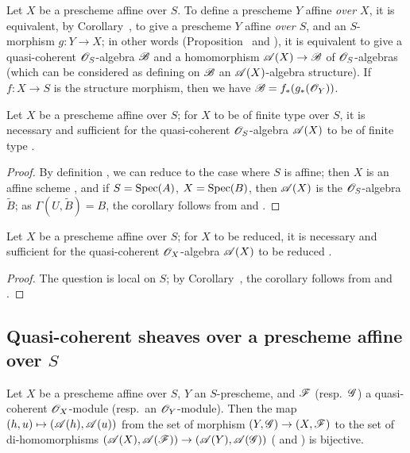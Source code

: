 \begin{env}[1.3.6]
\label{2.1.3.6}
Let $X$ be a prescheme affine over $S$.
To define a prescheme $Y$ affine \emph{over $X$}, it is equivalent, by Corollary~, to give a prescheme $Y$ affine \emph{over $S$}, and an $S$-morphism $g:Y\to X$; in other words (Proposition~ and ), it is equivalent to give a quasi-coherent $\mathscr{O}_S$-algebra $\mathscr{B}$ and a homomorphism $\sh{A}(X)\to\sh{B}$ of $\mathscr{O}_S$-algebras (which can be considered as defining on $\mathscr{B}$ an $\mathscr{A}(X)$-algebra structure).
If $f:X\to S$ is the structure morphism, then we have $\mathscr{B}=f_*(g_*(\mathscr{O}_Y))$.
\end{env}

\begin{corollary}[1.3.7]
\label{2.1.3.7}
Let $X$ be a prescheme affine over $S$; for $X$ to be of finite type over $S$, it is necessary and sufficient for the quasi-coherent $\mathscr{O}_S$-algebra $\mathscr{A}(X)$ to be of finite type .
\end{corollary}

\begin{proof}
\label{proof-2.1.3.7}
By definition , we can reduce to the case where $S$ is affine; then $X$ is an affine scheme , and if $S=\operatorname{Spec}(A)$, $X=\operatorname{Spec}(B)$, then $\mathscr{A}(X)$ is the $\mathscr{O}_S$-algebra $\widetilde{B}$; as $\Gamma(U,\widetilde{B})=B$, the corollary follows from  and .
\end{proof}

\begin{corollary}[1.3.8]
\label{2.1.3.8}
Let $X$ be a prescheme affine over $S$; for $X$ to be reduced, it is necessary and sufficient for the quasi-coherent $\mathscr{O}_X$-algebra $\mathscr{A}(X)$ to be reduced .
\end{corollary}

\begin{proof}
\label{proof-2.1.3.8}
The question is local on $S$; by Corollary~, the corollary follows from  and .
\end{proof}

\subsection{Quasi-coherent sheaves over a prescheme affine over $S$}
\label{subsection:2.1.4}

\begin{proposition}[1.4.1]
\label{2.1.4.1}
Let $X$ be a prescheme affine over $S$, $Y$ an $S$-prescheme, and $\mathscr{F}$ (resp.~$\mathscr{G}$) a quasi-coherent $\mathscr{O}_X$-module (resp.~an $\mathscr{O}_Y$-module).
Then the map $(h,u)\mapsto(\sh{A}(h),\sh{A}(u))$ from the set of morphism $(Y,\sh{G})\to(X,\sh{F})$ to the set of di-homomorphisms $(\sh{A}(X),\sh{A}(\sh{F}))\to(\sh{A}(Y),\sh{A}(\sh{G}))$ ( and ) is bijective.
\end{proposition}

